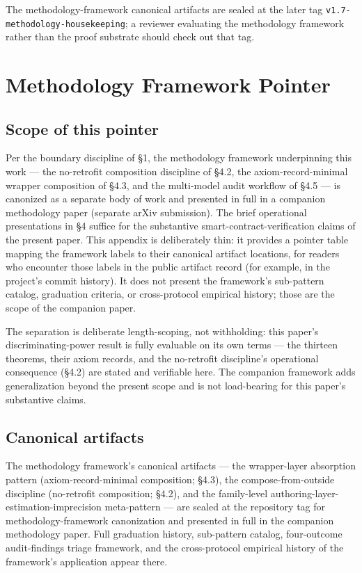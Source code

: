 The methodology-framework canonical artifacts are sealed at the later
tag \texttt{v1.7-methodology-housekeeping}; a reviewer evaluating the
methodology framework rather than the proof substrate should check out
that tag.

\section{Methodology Framework
Pointer}\label{methodology-framework-pointer}

\subsection{Scope of this pointer}\label{scope-of-this-pointer}

Per the boundary discipline of §1, the methodology framework
underpinning this work --- the no-retrofit composition discipline of
§4.2, the axiom-record-minimal wrapper composition of §4.3, and the
multi-model audit workflow of §4.5 --- is canonized as a separate body
of work and presented in full in a companion methodology paper (separate
arXiv submission). The brief operational presentations in §4 suffice for
the substantive smart-contract-verification claims of the present paper.
This appendix is deliberately thin: it provides a pointer table mapping
the framework labels to their canonical artifact locations, for readers
who encounter those labels in the public artifact record (for example,
in the project's commit history). It does not present the framework's
sub-pattern catalog, graduation criteria, or cross-protocol empirical
history; those are the scope of the companion paper.

The separation is deliberate length-scoping, not withholding: this
paper's discriminating-power result is fully evaluable on its own terms
--- the thirteen theorems, their axiom records, and the no-retrofit
discipline's operational consequence (§4.2) are stated and verifiable
here. The companion framework adds generalization beyond the present
scope and is not load-bearing for this paper's substantive claims.

\subsection{Canonical artifacts}\label{canonical-artifacts}

The methodology framework's canonical artifacts --- the wrapper-layer
absorption pattern (axiom-record-minimal composition; §4.3), the
compose-from-outside discipline (no-retrofit composition; §4.2), and the
family-level authoring-layer-estimation-imprecision meta-pattern --- are
sealed at the repository tag for methodology-framework canonization and
presented in full in the companion methodology paper. Full graduation
history, sub-pattern catalog, four-outcome audit-findings triage
framework, and the cross-protocol empirical history of the framework's
application appear there.


